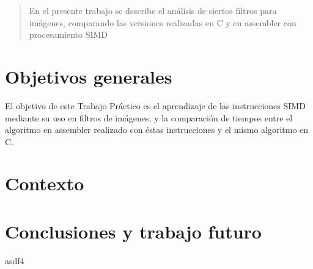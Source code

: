 \documentclass[a4paper]{article}
\begin{document}
\thispagestyle{empty}

\maketitle
\newpage

\thispagestyle{empty}
\vfill
\begin{abstract}
En el presente trabajo se describe el an\'alisis de siertos filtros para im\'agenes, comparando las versiones realizadas en C y en assembler con procesamiento SIMD
\end{abstract}
\newpage
\thispagestyle{empty}
\vspace{3cm}
\tableofcontents
\newpage


\normalsize
\newpage

\section{Objetivos generales}

El objetivo de este Trabajo Pr\'actico es el aprendizaje de las instrucciones SIMD mediante su uso en filtros de im\'agenes, y la comparaci\'on de tiempos entre el algoritmo en assembler realizado con \'estas instrucciones y el mismo algoritmo en C.


\section{Contexto}




%
\newpage

\newpage

\newpage

\newpage

\newpage
\section{Conclusiones y trabajo futuro}
asdf4
\end{document}
